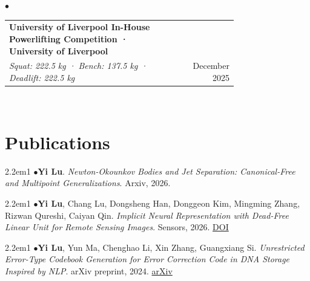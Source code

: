\documentclass[11pt, a4paper]{article}
\begin{document}
\hspace{1em}$\bullet$\quad\begin{tabular}{@{}p{0.75\linewidth}r@{}}\textbf{University of Liverpool In-House Powerlifting Competition · University of Liverpool}\\
\textit{Squat: 222.5 kg · Bench: 137.5 kg · Deadlift: 222.5 kg} & December 2025\\\end{tabular}\\

\section{Publications}

\begin{hangparas}{2.2em}{1}
\hspace{1em}$\bullet$\quad \textbf{Yi Lu}. \textit{Newton-Okounkov Bodies and Jet Separation: Canonical-Free and Multipoint Generalizations}. Arxiv, 2026.\\
\end{hangparas}

\begin{hangparas}{2.2em}{1}
\hspace{1em}$\bullet$\quad \textbf{Yi Lu}, Chang Lu, Dongsheng Han, Donggeon Kim, Mingming Zhang, Rizwan Qureshi, Caiyan Qin. \textit{Implicit Neural Representation with Dead-Free Linear Unit for Remote Sensing Images}. Sensors, 2026. \href{https://doi.org/10.3390/s26082370}{DOI}\\
\end{hangparas}

\begin{hangparas}{2.2em}{1}
\hspace{1em}$\bullet$\quad \textbf{Yi Lu}, Yun Ma, Chenghao Li, Xin Zhang, Guangxiang Si. \textit{Unrestricted Error-Type Codebook Generation for Error Correction Code in DNA Storage Inspired by NLP}. arXiv preprint, 2024. \href{https://arxiv.org/abs/2401.15915}{arXiv}\\
\end{hangparas}
\end{document}

